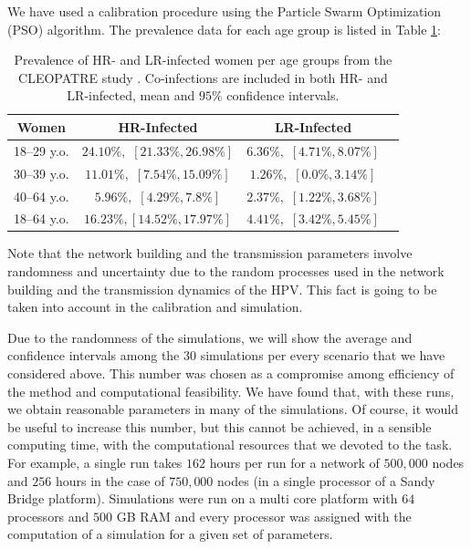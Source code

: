 We have used a calibration procedure using the Particle Swarm Optimization (PSO) algorithm. The prevalence data for each age group is listed in Table \ref{datosConstruccion}:

\begin{table}[H]
	\centering
	\caption{Prevalence of HR- and LR-infected women per age groups from the 
CLEOPATRE study \protect\cite{castellsague2012prevalence}. Co-infections are included in both HR- and LR-infected, mean and $95\%$ confidence intervals.}
	\begin{tabular}{cccc}
		\toprule
		\textbf{Women} & \textbf{HR-Infected} & \textbf{LR-Infected} \\
		\midrule
		18--29 y.o. & $24.10\%,$ $[21.33\%, 26.98\%]$ & $6.36\%,$ $[4.71\%, 8.07\%]$ \\
		30--39 y.o. & $11.01\%,$ $[7.54\%, 15.09\%]$ & $1.26\%,$ $[0.0\%, 3.14\%]$ \\
		40--64 y.o. & $5.96\%,$ $[4.29\%, 7.8\%]$ & $2.37\%,$ $[1.22\%, 3.68\%]$ \\
		\midrule
		18--64 y.o. & $16.23\%,$$[14.52\%, 17.97\%]$ & $4.41\%,$ $[3.42\%, 5.45\%]$ \\
		\bottomrule
	\end{tabular}
	\label{datosConstruccion}
\end{table}

Note that the network building and the transmission parameters involve randomness and uncertainty due to the random processes used in the network building and the transmission dynamics of the HPV. This fact is going to be taken into account in the  calibration and simulation.

Due to the randomness of the simulations, we will show the average and confidence intervals among the $30$ simulations per every scenario that we have considered above. This number was chosen as a compromise among efficiency of the method and computational feasibility. We have found that, with these runs, we obtain reasonable parameters in many of the simulations. Of course, it would be useful to increase this number, but this cannot be achieved, in a sensible computing time, with the computational resources that we devoted to the task. For example, a single run takes $162$ hours per run for a network of $500,000$ nodes and $256$ hours in the case of $750,000$ nodes (in a single processor of a Sandy Bridge platform). Simulations were run on a multi core platform with $64$ processors and $500$ GB RAM and every processor was assigned with the computation of a simulation for a given set of parameters.

